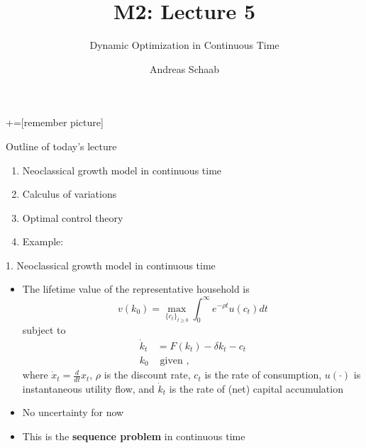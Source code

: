\documentclass[10pt]{beamer}
\title{\large M2: Lecture 5}
\subtitle{Dynamic Optimization in Continuous Time}
\author{Andreas Schaab}
\date{}
\begin{document}
+=[remember picture]
\thispagestyle{empty}
\maketitle 
\newpage

\addtocounter{framenumber}{-1}




\begin{frame}{Outline of today's lecture}
\addtocounter{framenumber}{-1}

\begin{enumerate}
\item Neoclassical growth model in continuous time
\vspace{3mm}
\item Calculus of variations
\vspace{3mm}
\item Optimal control theory
\vspace{3mm}
\item Example: 
\end{enumerate}
\end{frame}



\begin{frame}{1. Neoclassical growth model in continuous time}
\begin{itemize}
	\item The lifetime value of the representative household is
	\begin{equation*}
		v(k_0) = \max_{\{ c_t \}_{t \geq 0} } \int_0^\infty e^{-\rho t} u(c_t) dt
	\end{equation*}
	subject to
	\begin{align*}
		\dot k_t &= F(k_t) - \delta k_t - c_t \\
		k_0 &\text{ given },
	\end{align*}
	where $\dot x_t = \frac{d}{dt} x_t$, $\rho$ is the discount rate, $c_t$ is the rate of consumption, $u(\cdot)$ is instantaneous utility flow, and $\dot k_t$ is the rate of (net) capital accumulation
	
	\item No uncertainty for now
	
	\item This is the \textbf{sequence problem} in continuous time
\end{itemize}
\end{frame}
\end{document}
